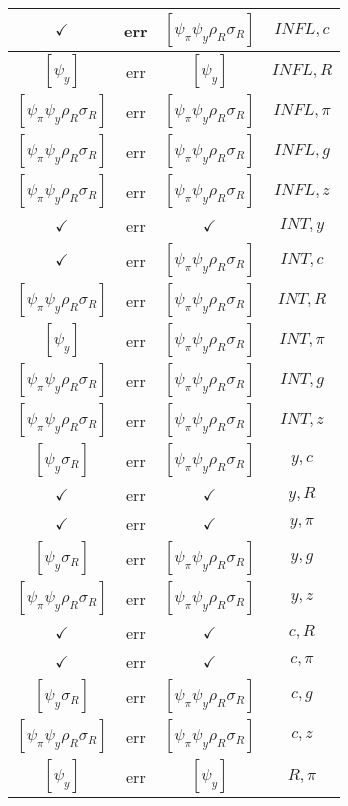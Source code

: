 \documentclass[a4paper,10pt]{article}
\begin{document}
\begin{longtable}{|c|c|c|c|}
$\checkmark$ & err & $[\psi_\pi \psi_y \rho_R \sigma_R ]$ & ${INFL},{c}$ \\
\hline
$[\psi_y ]$ & err & $[\psi_y ]$ & ${INFL},{R}$ \\
\hline
$[\psi_\pi \psi_y \rho_R \sigma_R ]$ & err & $[\psi_\pi \psi_y \rho_R \sigma_R ]$ & ${INFL},{\pi}$ \\
\hline
$[\psi_\pi \psi_y \rho_R \sigma_R ]$ & err & $[\psi_\pi \psi_y \rho_R \sigma_R ]$ & ${INFL},{g}$ \\
\hline
$[\psi_\pi \psi_y \rho_R \sigma_R ]$ & err & $[\psi_\pi \psi_y \rho_R \sigma_R ]$ & ${INFL},{z}$ \\
\hline
$\checkmark$ & err & $\checkmark$ & ${INT},{y}$ \\
\hline
$\checkmark$ & err & $[\psi_\pi \psi_y \rho_R \sigma_R ]$ & ${INT},{c}$ \\
\hline
$[\psi_\pi \psi_y \rho_R \sigma_R ]$ & err & $[\psi_\pi \psi_y \rho_R \sigma_R ]$ & ${INT},{R}$ \\
\hline
$[\psi_y ]$ & err & $[\psi_\pi \psi_y \rho_R \sigma_R ]$ & ${INT},{\pi}$ \\
\hline
$[\psi_\pi \psi_y \rho_R \sigma_R ]$ & err & $[\psi_\pi \psi_y \rho_R \sigma_R ]$ & ${INT},{g}$ \\
\hline
$[\psi_\pi \psi_y \rho_R \sigma_R ]$ & err & $[\psi_\pi \psi_y \rho_R \sigma_R ]$ & ${INT},{z}$ \\
\hline
$[\psi_y \sigma_R ]$ & err & $[\psi_\pi \psi_y \rho_R \sigma_R ]$ & ${y},{c}$ \\
\hline
$\checkmark$ & err & $\checkmark$ & ${y},{R}$ \\
\hline
$\checkmark$ & err & $\checkmark$ & ${y},{\pi}$ \\
\hline
$[\psi_y \sigma_R ]$ & err & $[\psi_\pi \psi_y \rho_R \sigma_R ]$ & ${y},{g}$ \\
\hline
$[\psi_\pi \psi_y \rho_R \sigma_R ]$ & err & $[\psi_\pi \psi_y \rho_R \sigma_R ]$ & ${y},{z}$ \\
\hline
$\checkmark$ & err & $\checkmark$ & ${c},{R}$ \\
\hline
$\checkmark$ & err & $\checkmark$ & ${c},{\pi}$ \\
\hline
$[\psi_y \sigma_R ]$ & err & $[\psi_\pi \psi_y \rho_R \sigma_R ]$ & ${c},{g}$ \\
\hline
$[\psi_\pi \psi_y \rho_R \sigma_R ]$ & err & $[\psi_\pi \psi_y \rho_R \sigma_R ]$ & ${c},{z}$ \\
\hline
$[\psi_y ]$ & err & $[\psi_y ]$ & ${R},{\pi}$ \\
\hline

\end{longtable}
\end{document}
